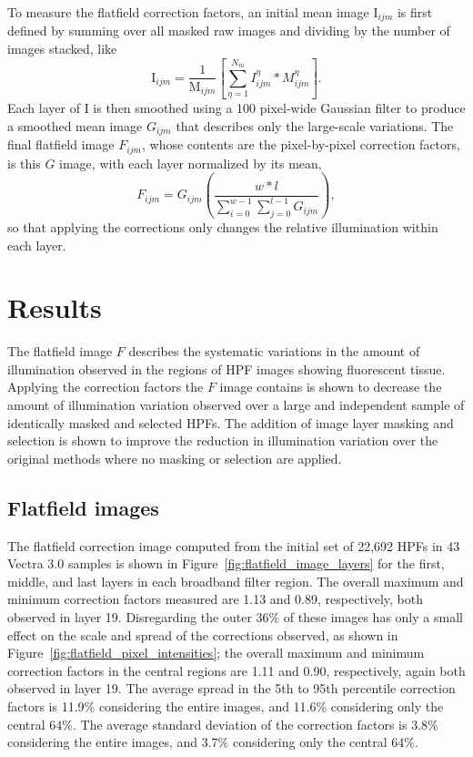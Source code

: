 \documentclass[letterpaper,11pt]{article}
\newcommand{\reffig}[1]{Figure~\ref{#1}}
\newcommand{\Iota}{\mathrm{I}}
\newcommand{\Mu}{\mathrm{M}}
\begin{document}
To measure the flatfield correction factors, an initial mean image $\Iota_{ijm}$ is first defined by summing over all masked raw images and dividing by the number of images stacked, like
\begin{equation}
\Iota_{ijm} = \frac{1}{\Mu_{ijm}} \left[ \sum_{\eta=1}^{N_{m}} I^{\eta}_{ijm}*M^{\eta}_{ijm} \right] .
\end{equation}
Each layer of $\Iota$ is then smoothed using a 100 pixel-wide Gaussian filter to produce a smoothed mean image $G_{ijm}$ that describes only the large-scale variations. The final flatfield image $F_{ijm}$, whose contents are the pixel-by-pixel correction factors, is this $G$ image, with each layer normalized by its mean,
\begin{equation}
F_{ijm} = G_{ijm} \left( \frac{w*l}{\sum_{i=0}^{w-1}\sum_{j=0}^{l-1}G_{ijm}} \right) ,
\end{equation}
so that applying the corrections only changes the relative illumination within each layer. 

\section{Results}
\label{sec:results}

The flatfield image $F$ describes the systematic variations in the amount of illumination observed in the regions of HPF images showing fluorescent tissue. Applying the correction factors the $F$ image contains is shown to decrease the amount of illumination variation observed over a large and independent sample of identically masked and selected HPFs. The addition of image layer masking and selection is shown to improve the reduction in illumination variation over the original methods where no masking or selection are applied.

\subsection{Flatfield images}
\label{ssec:flatfield_images}

The flatfield correction image computed from the initial set of 22,692 HPFs in 43 Vectra 3.0 samples is shown in \reffig{fig:flatfield_image_layers} for the first, middle, and last layers in each broadband filter region. The overall maximum and minimum correction factors measured are 1.13 and 0.89, respectively, both observed in layer 19. Disregarding the outer 36\% of these images has only a small effect on the scale and spread of the corrections observed, as shown in \reffig{fig:flatfield_pixel_intensities}; the overall maximum and minimum correction factors in the central regions are 1.11 and 0.90, respectively, again both observed in layer 19. The average spread in the 5th to 95th percentile correction factors is 11.9\% considering the entire images, and 11.6\% considering only the central 64\%. The average standard deviation of the correction factors is 3.8\% considering the entire images, and 3.7\% considering only the central 64\%. 
\end{document}
